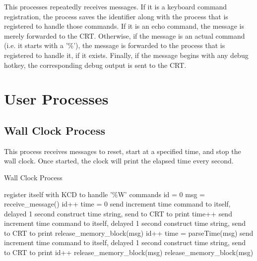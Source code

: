 \documentclass[12pt]{report}
\begin{document}
This processes repeatedly receives messages. If it is a keyboard command registration, the process saves the identifier along with the process that is registered to handle those commands. If it is an echo command, the message is merely forwarded to the CRT. Otherwise, if the message is an actual command (i.e. it starts with a '\%'), the message is forwarded to the process that is registered to handle it, if it exists. Finally, if the message begins with any debug hotkey, the corresponding debug output is sent to the CRT.


\section{User Processes}

\subsection{Wall Clock Process}

This process receives messages to reset, start at a specified time, and stop the wall clock. Once started, the clock will print the elapsed time every second.

\begin{algorithm}[H]
	\caption{Wall Clock Process}
	\begin{algorithmic}[1]
	    \State register itself with KCD to handle '\%W' commands
	    \State id = 0
	    \texttt{}
	      \State msg = receive\_message()
	        \State id++
	        \State time = 0
	        \State send increment time command to itself, delayed 1 second
	        \State construct time string, send to CRT to print
	          \State time++
	          \State send increment time command to itself, delayed 1 second
	          \State construct time string, send to CRT to print
	        \Else
	          \State release\_memory\_block(msg)
	        \EndIf
	        \State id++
	        \State time = parseTime(msg)
	        \State send increment time command to itself, delayed 1 second
	        \State construct time string, send to CRT to print
	        \State id++
	        \State release\_memory\_block(msg)
	      \Else
	        \State release\_memory\_block(msg)
	      \EndIf
	    \EndWhile
	  \EndFunction
	\end{algorithmic}
\end{algorithm}
\end{document}
